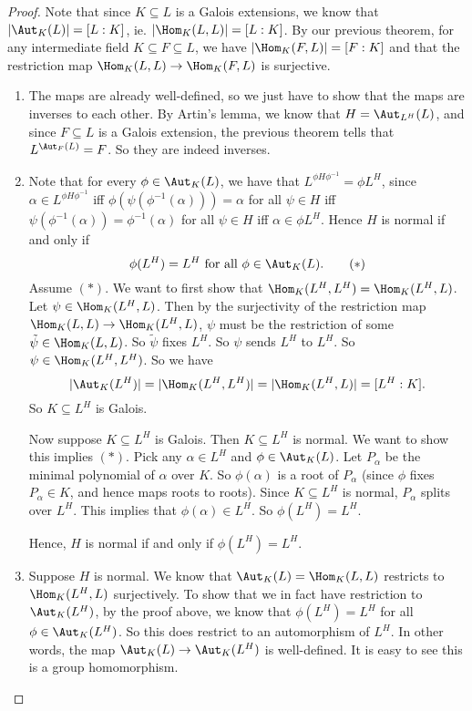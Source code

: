 \documentclass[a4paper]{article}
\begin{document}
\begin{proof}\leavevmode
  Note that since $K\subseteq L$ is a Galois extensions, we know that $|\Aut_K(L)| = [L:K]$, ie. $|\Hom_K(L, L)| = [L:K]$. By our previous theorem, for any intermediate field $K\subseteq F \subseteq L$, we have $|\Hom_K(F, L)| = [F:K]$ and that the restriction map $\Hom_K(L, L) \to \Hom_K(F, L)$ is surjective.

  \begin{enumerate}
    \item The maps are already well-defined, so we just have to show that the maps are inverses to each other. By Artin's lemma, we know that $H = \Aut_{L^H}(L)$, and since $F\subseteq L$ is a Galois extension, the previous theorem tells that $L^{\Aut_F (L)} = F$. So they are indeed inverses.
    \item Note that for every $\phi \in \Aut_K(L)$, we have that $L^{\phi H \phi^{-1}} = \phi L^H$, since $\alpha \in L^{\phi H \phi^{-1}}$ iff $\phi (\psi (\phi^{-1} (\alpha))) = \alpha$ for all $\psi \in H$ iff $\psi (\phi^{-1}(\alpha)) = \phi^{-1}(\alpha)$ for all $\psi \in H$ iff $\alpha \in \phi L^H$. Hence $H$ is normal if and only if
      \[
        \phi(L^H) = L^H\text{ for all }\phi \in \Aut_K(L).\tag{$*$}
      \]
      Assume $(*)$. We want to first show that $\Hom_K(L^H, L^H) = \Hom_K(L^H, L)$. Let $\psi \in \Hom_K(L^H, L)$. Then by the surjectivity of the restriction map $\Hom_K(L, L) \to \Hom_K(L^H, L)$, $\psi$ must be the restriction of some $\tilde{\psi} \in \Hom_K(L, L)$. So $\tilde{\psi}$ fixes $L^H$. So $\psi$ sends $L^H$ to $L^H$. So $\psi \in \Hom_K(L^H, L^H)$. So we have
      \[
        |\Aut_K(L^H)| = |\Hom_K(L^H, L^H)| = |\Hom_K(L^H, L)| = [L^H:K].
      \]
      So $K\subseteq L^H$ is Galois.

      Now suppose $K\subseteq L^H$ is Galois. Then $K\subseteq L^H$ is normal. We want to show this implies $(*)$.  Pick any $\alpha \in L^H$ and $\phi\in \Aut_K(L)$. Let $P_\alpha$ be the minimal polynomial of $\alpha$ over $K$. So $\phi(\alpha)$ is a root of $P_\alpha$ (since $\phi$ fixes $P_\alpha \in K$, and hence maps roots to roots). Since $K\subseteq L^H$ is normal, $P_\alpha$ splits over $L^H$. This implies that $\phi(\alpha) \in L^H$. So $\phi(L^H) = L^H$.

      Hence, $H$ is normal if and only if $\phi(L^H) = L^H$.
    \item Suppose $H$ is normal. We know that $\Aut_K(L) = \Hom_K(L, L)$ restricts to $\Hom_K(L^H, L)$ surjectively. To show that we in fact have restriction to $\Aut_K(L^H)$, by the proof above, we know that $\phi(L^H) = L^H$ for all $\phi \in \Aut_K(L^H)$. So this does restrict to an automorphism of $L^H$. In other words, the map $\Aut_K(L) \to \Aut_K(L^H)$ is well-defined. It is easy to see this is a group homomorphism.


\end{enumerate}
\end{proof}
\end{document}
